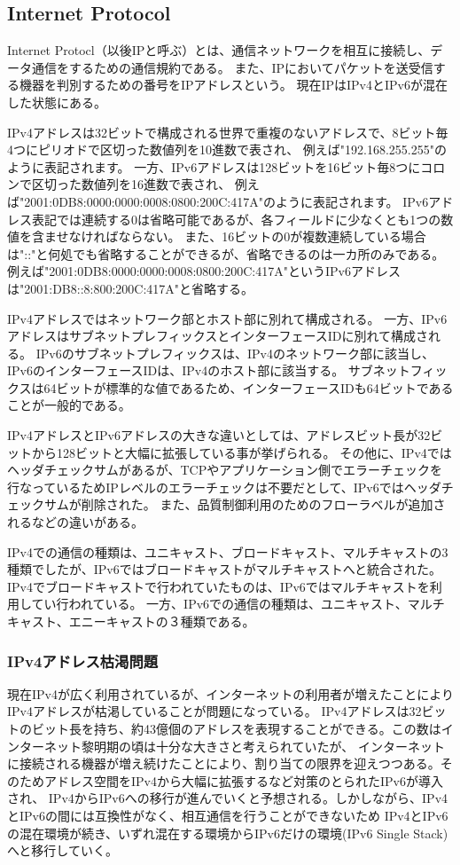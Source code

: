 \documentclass[a4j]{jarticle}
\begin{document}
\subsection{Internet Protocol}
Internet Protocl（以後IPと呼ぶ）とは、通信ネットワークを相互に接続し、データ通信をするための通信規約である。
また、IPにおいてパケットを送受信する機器を判別するための番号をIPアドレスという。
現在IPはIPv4とIPv6が混在した状態にある。

IPv4アドレスは32ビットで構成される世界で重複のないアドレスで、8ビット毎4つにピリオドで区切った数値列を10進数で表され、
例えば"192.168.255.255"のように表記されます。
一方、IPv6アドレスは128ビットを16ビット毎8つにコロンで区切った数値列を16進数で表され、
例えば"2001:0DB8:0000:0000:0008:0800:200C:417A"のように表記されます。
IPv6アドレス表記では連続する0は省略可能であるが、各フィールドに少なくとも1つの数値を含ませなければならない。
また、16ビットの0が複数連続している場合は"::"と何処でも省略することができるが、省略できるのは一カ所のみである。
例えば"2001:0DB8:0000:0000:0008:0800:200C:417A"というIPv6アドレスは"2001:DB8::8:800:200C:417A"と省略する。

IPv4アドレスではネットワーク部とホスト部に別れて構成される。
一方、IPv6アドレスはサブネットプレフィックスとインターフェースIDに別れて構成される。
IPv6のサブネットプレフィックスは、IPv4のネットワーク部に該当し、IPv6のインターフェースIDは、IPv4のホスト部に該当する。
サブネットフィックスは64ビットが標準的な値であるため、インターフェースIDも64ビットであることが一般的である。

IPv4アドレスとIPv6アドレスの大きな違いとしては、アドレスビット長が32ビットから128ビットと大幅に拡張している事が挙げられる。
その他に、IPv4ではヘッダチェックサムがあるが、TCPやアプリケーション側でエラーチェックを行なっているためIPレベルのエラーチェックは不要だとして、IPv6ではヘッダチェックサムが削除された。
また、品質制御利用のためのフローラベルが追加されるなどの違いがある。

IPv4での通信の種類は、ユニキャスト、ブロードキャスト、マルチキャストの3種類でしたが、IPv6ではブロードキャストがマルチキャストへと統合された。
IPv4でブロードキャストで行われていたものは、IPv6ではマルチキャストを利用してい行われている。
一方、IPv6での通信の種類は、ユニキャスト、マルチキャスト、エニーキャストの３種類である。

\subsubsection{IPv4アドレス枯渇問題}
現在IPv4が広く利用されているが、インターネットの利用者が増えたことによりIPv4アドレスが枯渇していることが問題になっている。
IPv4アドレスは32ビットのビット長を持ち、約43億個のアドレスを表現することができる。この数はインターネット黎明期の頃は十分な大きさと考えられていたが、
インターネットに接続される機器が増え続けたことにより、割り当ての限界を迎えつつある。そのためアドレス空間をIPv4から大幅に拡張するなど対策のとられたIPv6が導入され、
IPv4からIPv6への移行が進んでいくと予想される。しかしながら、IPv4とIPv6の間には互換性がなく、相互通信を行うことができないため
IPv4とIPv6の混在環境が続き、いずれ混在する環境からIPv6だけの環境(IPv6 Single Stack)へと移行していく。
\end{document}
